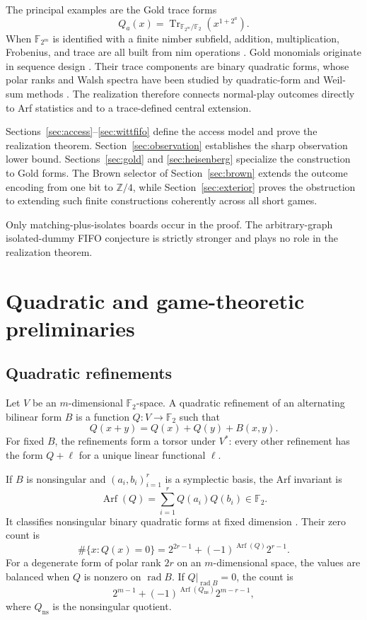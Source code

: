 \documentclass[11pt]{article}
\theoremstyle{definition}
\theoremstyle{remark}
\newcommand{\F}{\mathbb{F}}
\newcommand{\Tr}{\operatorname{Tr}}
\newcommand{\Arf}{\operatorname{Arf}}
\newcommand{\rad}{\operatorname{rad}}
\begin{document}
The principal examples are the Gold trace forms
\[
  Q_a(x)=\Tr_{\F_{2^m}/\F_2}(x^{1+2^a}).
\]
When $\F_{2^m}$ is identified with a finite nimber subfield, addition,
multiplication, Frobenius, and trace are all built from nim operations
\cite{conway1976,lenstra1978}.  Gold monomials originate in sequence design
\cite{gold1968}.  Their trace components are binary quadratic forms, whose
polar ranks and Walsh spectra have been studied by quadratic-form and
Weil-sum methods
\cite{coulter1999,hellesethkumar1998,lahtonenmcguireward2007}.  The realization
therefore connects normal-play outcomes directly to Arf statistics and to a
trace-defined central extension.

Sections~\ref{sec:access}--\ref{sec:wittfifo} define the access model and
prove the realization theorem.  Section~\ref{sec:observation} establishes
the sharp observation lower bound.  Sections~\ref{sec:gold} and
\ref{sec:heisenberg} specialize the construction to Gold forms.  The Brown
selector of Section~\ref{sec:brown} extends the outcome encoding from one bit
to $\mathbb Z/4$, while Section~\ref{sec:exterior} proves the obstruction to
extending such finite constructions coherently across all short games.

Only matching-plus-isolates boards occur in the proof.  The arbitrary-graph
isolated-dummy FIFO conjecture is strictly stronger and plays no role in the
realization theorem.

\section{Quadratic and game-theoretic preliminaries}

\subsection{Quadratic refinements}

Let $V$ be an $m$-dimensional $\F_2$-space.  A quadratic refinement of an
alternating bilinear form $B$ is a function $Q:V\to\F_2$ such that
\[
  Q(x+y)=Q(x)+Q(y)+B(x,y).
\]
For fixed $B$, the refinements form a torsor under $V^*$: every other
refinement has the form $Q+\ell$ for a unique linear functional $\ell$.

If $B$ is nonsingular and $(a_i,b_i)_{i=1}^r$ is a symplectic basis, the Arf
invariant is
\[
  \Arf(Q)=\sum_{i=1}^r Q(a_i)Q(b_i)\in\F_2.
\]
It classifies nonsingular binary quadratic forms at fixed dimension
\cite{arf1941,elmankarpenkomerkurjev2008}.  Their zero count is
\[
  \#\{x:Q(x)=0\}
  =2^{2r-1}+(-1)^{\Arf(Q)}2^{r-1}.
\]
For a degenerate form of polar rank $2r$ on an $m$-dimensional space, the
values are balanced when $Q$ is nonzero on $\rad B$.  If $Q|_{\rad B}=0$,
the count is
\[
  2^{m-1}+(-1)^{\Arf(Q_{\mathrm{ns}})}2^{m-r-1},
\]
where $Q_{\mathrm{ns}}$ is the nonsingular quotient.
\end{document}
